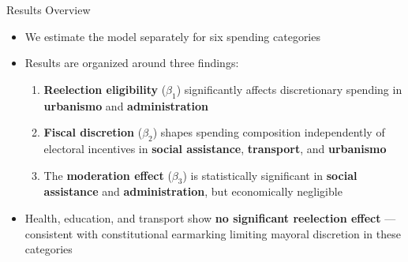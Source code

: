 \documentclass{beamer}
\begin{document}
\begin{frame}{Results Overview}
\begin{itemize}
    \item We estimate the model separately for six spending categories
    \vspace{0.5em}
    \item Results are organized around three findings:
    \vspace{0.5em}
    \begin{enumerate}
        \item \textbf{Reelection eligibility} ($\beta_1$) significantly affects discretionary spending in \textbf{urbanismo} and \textbf{administration}
        \vspace{0.3em}
        \item \textbf{Fiscal discretion} ($\beta_2$) shapes spending composition independently of electoral incentives in \textbf{social assistance}, \textbf{transport}, and \textbf{urbanismo}
        \vspace{0.3em}
        \item The \textbf{moderation effect} ($\beta_3$) is statistically significant in \textbf{social assistance} and \textbf{administration}, but economically negligible
    \end{enumerate}
    \vspace{0.5em}
    \item Health, education, and transport show \textbf{no significant reelection effect} --- consistent with constitutional earmarking limiting mayoral discretion in these categories
\end{itemize}
\end{frame}
\end{document}
